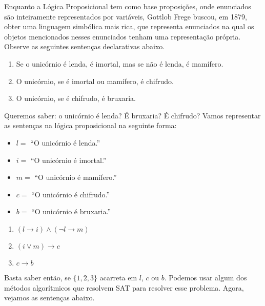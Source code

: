 Enquanto a Lógica Proposicional tem como base proposições, onde enunciados são inteiramente representados por variáveis, Gottlob Frege buscou, em 1879, obter uma linguagem simbólica mais rica, que representa enunciados na qual os objetos mencionados nesses enunciados tenham uma representação própria. Observe as seguintes sentenças declarativas abaixo.

\begin{enumerate}
    \item Se o unicórnio é lenda, é imortal, mas se não é lenda, é mamífero.
    \item O unicórnio, se é imortal ou mamífero, é chifrudo.
    \item O unicórnio, se é chifrudo, é bruxaria.
\end{enumerate}
Queremos saber: o unicórnio é lenda? É bruxaria? É chifrudo? Vamos representar as sentenças na lógica proposicional na seguinte forma:

\begin{itemize}
    \item $l =$ ``O unicórnio é lenda.''
    \item $i =$ ``O unicórnio é imortal.''
    \item $m =$ ``O unicórnio é mamífero.''
    \item $c =$ ``O unicórnio é chifrudo.''
    \item $b =$ ``O unicórnio é bruxaria.''
\end{itemize}
\begin{enumerate}
    \item $(l \rightarrow i) \land (\neg l \rightarrow m)$
    \item $(i \lor m) \rightarrow c$
    \item $c \rightarrow b$
\end{enumerate}
Basta saber então, se $\{1,2,3\}$ acarreta em $l$, $c$ ou $b$. Podemos usar algum dos métodos algorítmicos que resolvem SAT para resolver esse problema. Agora, vejamos as sentenças abaixo.

